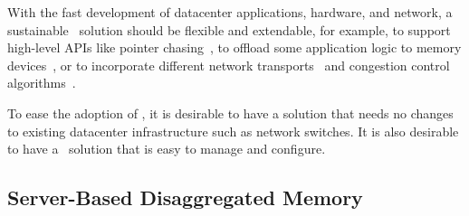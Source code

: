 With the fast development of datacenter applications, hardware, and network, a sustainable \md\ solution should be flexible and extendable,
for example, to support high-level APIs like pointer chasing~\cite{AIFM,Aguilera-FarMemory},
to offload some application logic to memory devices~\cite{AIFM,StRoM},
or to incorporate different network transports~\cite{Homa,NDP,TONIC} and congestion control algorithms~\cite{swift-sigcomm,1RMA,hpcc-sigcomm19}.

To ease the adoption of \md, it is desirable to have a solution 
that needs no changes to existing datacenter infrastructure such as network switches.
It is also desirable to have a \md\ solution that is easy to manage and configure.
\fi
%



\subsection{Server-Based Disaggregated Memory}
\label{sec:rdma}

